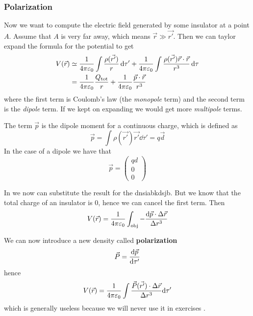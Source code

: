 \documentclass[12pt]{extarticle}
\begin{document}
\subsubsection{Polarization}

Now we want to compute the electric field generated by some insulator at a point $A$.
Assume that $A$ is very far away, which means $\vec r \gg \vec{r'}$.
Then we can taylor expand the formula for the potential to get
\begin{align}
	V(\vec r) & \simeq \frac{1}{4 \pi \varepsilon_0} \int \frac{\rho(\vec{r'})}{r} \dd{\tau '} + \frac{1}{4 \pi \varepsilon_0} \int \frac{\rho (\vec{r'}) \vec r \cdot \vec r}{r^3} \dd{\tau} \\
	          & = \frac{1}{4 \pi \varepsilon_0} \frac{Q_\text{tot}}{r} + \frac{1}{4 \pi \varepsilon_0} \frac{\vec p \cdot \vec r}{r^3} \label{eq:potential-insulator}
\end{align}
where the first term is Coulomb's law (the \emph{monopole} term) and the second term is the \emph{dipole} term.
If we kept on expanding we would get more \emph{multipole} terms.

The term $\vec p$ is the dipole moment for a continuous charge, which is defined as
\begin{equation}
	\vec p = \int \rho (\vec{r'}) \vec{r'} \dd{\tau '} = q \vec d
\end{equation}
In the case of a dipole we have that
\begin{equation}
	\vec p = \begin{pmatrix}
		qd \\ 0 \\ 0
	\end{pmatrix}
\end{equation}

In  we now can substitute the result for the dnsiabkdsjb.
But we know that the total charge of an insulator is $0$, hence we can cancel the first term.
Then
\begin{equation}
	V(\vec r) = \frac{1}{4 \pi \varepsilon_0} \int_\text{obj} -\frac{\dd \vec p \cdot \Delta \vec r}{\Delta r ^3}
\end{equation}

We can now introduce a new density called \textbf{polarization}
\begin{equation}
	\vec P = \dv{\vec p}{\tau '}
\end{equation}
hence
\begin{equation}
	V(\vec r) = \frac{1}{4 \pi \varepsilon_0} \int \frac{\vec P(\vec{r'}) \cdot \Delta \vec r}{ \Delta r^3} \dd \tau'
\end{equation}
which is generally useless because we will never use it in exercises .
\end{document}
